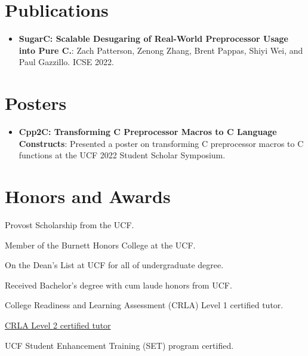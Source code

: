 \documentclass[a4paper,20pt]{article}
\newcommand{\resumeItem}[2]{
  \item\small{
    \textbf{#1}{: #2 \vspace{-2pt}}
  }
}
\newcommand{\resumeSubItem}[2]{\resumeItem{#1}{#2}\vspace{-3pt}}
\newcommand{\resumeSubHeadingListStart}{\begin{itemize}[leftmargin=*]}
\newcommand{\resumeSubHeadingListEnd}{\end{itemize}}
\begin{document}
\vspace{-5pt}
\section{Publications}
\resumeSubHeadingListStart
\resumeSubItem
{SugarC: Scalable Desugaring of Real-World Preprocessor Usage into Pure C.}
{Zach Patterson, Zenong Zhang, Brent Pappas, Shiyi Wei, and Paul Gazzillo. ICSE 2022.}
\resumeSubHeadingListEnd

\vspace{-5pt}
\section{Posters}
\resumeSubHeadingListStart
\resumeSubItem
{Cpp2C: Transforming C Preprocessor Macros to C Language Constructs}
{Presented a poster on transforming C preprocessor macros to C functions at the UCF 2022 Student Scholar Symposium.}
\resumeSubHeadingListEnd

\vspace{-5pt}
\section{Honors and Awards}
\begin{description}[font=$\bullet$]
  \item {Provost Scholarship from the UCF.}
        \vspace{-5pt}
  \item {Member of the Burnett Honors College at the UCF.}
        \vspace{-5pt}
  \item {On the Dean's List at UCF for all of undergraduate degree.}
        \vspace{-5pt}
  \item {Received Bachelor's degree with cum laude honors from UCF.}
        \vspace{-5pt}
  \item {College Readiness and Learning Assessment (CRLA) Level 1 certified tutor.}
        \vspace{-5pt}
  \item {\href{https://drive.google.com/file/d/1idZ5hhQQF4f-ZRQCBUplQTGU9YjS7fUs/view?usp=sharing}{CRLA Level 2 certified tutor}}
        \vspace{-5pt}
  \item {UCF Student Enhancement Training (SET) program certified.}

\end{description}
\end{document}
